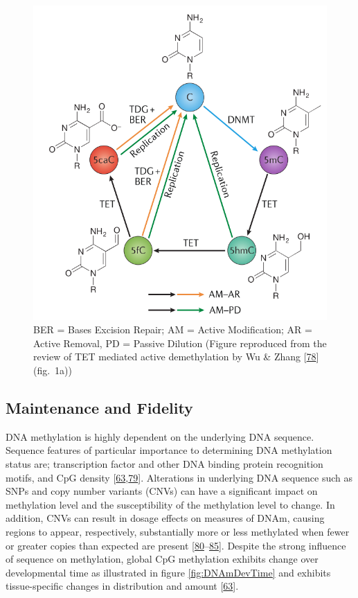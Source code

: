 \documentclass[
]{book}
\begin{document}
\begin{figure}

{\centering \includegraphics[width=0.6\linewidth]{figs/Wu2017TETsDNAmCycle} 

}

\caption{BER = Bases Excision Repair; AM = Active Modification; AR = Active Removal, PD = Passive Dilution (Figure reproduced from the review of TET mediated active demethylation by Wu \& Zhang {[}\protect\hyperlink{ref-Wu2017}{78}{]} (fig.~1a))}\label{fig:Wu2017TETsDNAmCycle}
\end{figure}



\hypertarget{maintenance-and-fidelity}{%
\subsection{Maintenance and Fidelity}\label{maintenance-and-fidelity}}

DNA methylation is highly dependent on the underlying DNA sequence.
Sequence features of particular importance to determining DNA methylation status are; transcription factor and other DNA binding protein recognition motifs, and CpG density {[}\protect\hyperlink{ref-Ziller2013}{63},\protect\hyperlink{ref-Lienert2011}{79}{]}.
Alterations in underlying DNA sequence such as SNPs and copy number variants (CNVs) can have a significant impact on methylation level and the susceptibility of the methylation level to change.
In addition, CNVs can result in dosage effects on measures of DNAm, causing regions to appear, respectively, substantially more or less methylated when fewer or greater copies than expected are present {[}\protect\hyperlink{ref-Boks2009}{80}--\protect\hyperlink{ref-Martin-Trujillo2017}{85}{]}.
Despite the strong influence of sequence on methylation, global CpG methylation exhibits change over developmental time as illustrated in figure \ref{fig:DNAmDevTime} and exhibits tissue-specific changes in distribution and amount {[}\protect\hyperlink{ref-Ziller2013}{63}{]}.
\end{document}
